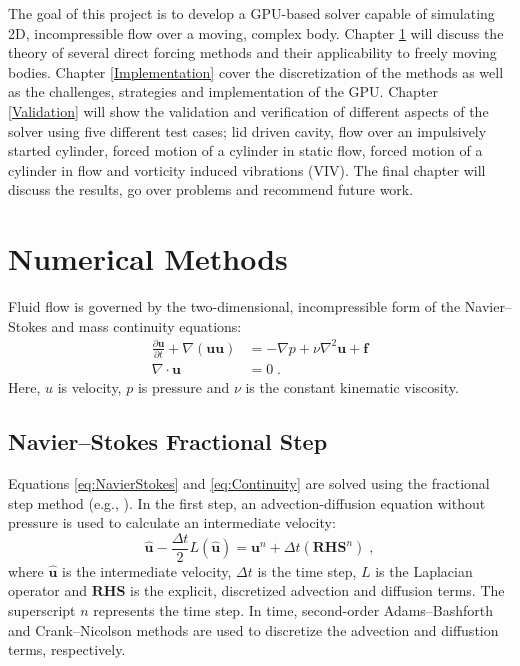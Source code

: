 \documentclass[onehalf,11pt]{beavtex}
\begin{document}
The goal of this project is to develop a GPU-based solver capable of simulating 2D, incompressible flow over a moving, complex body. 
Chapter \ref{Numerical Methods} will discuss the theory of several direct forcing methods and their applicability to freely moving bodies. 
Chapter \ref{Implementation} cover the discretization of the methods as well as the challenges, strategies and implementation of the GPU.
Chapter \ref{Validation} will show the validation and verification of different aspects of the solver using five different test cases; lid driven cavity, flow over an impulsively started cylinder, forced motion of a cylinder in static flow, forced motion of a cylinder in flow and vorticity induced vibrations (VIV).
The final chapter will discuss the results, go over problems and recommend future work.

\chapter{Numerical Methods}\label{Numerical Methods}
Fluid flow is governed by the two-dimensional, incompressible form of the Navier--Stokes and mass continuity equations:
\begin{align}
\frac{\partial \textbf{u}}{\partial t} + \nabla ( \textbf{uu} ) &= -\nabla p + \nu\nabla^{2}\textbf{u} + \textbf{f} \label{eq:NavierStokes} \\
\nabla \cdot \textbf{u} &= 0 \label{eq:Continuity} \;.
\end{align}
Here, $u$ is velocity, $p$ is pressure and $\nu$ is the constant kinematic viscosity.

\section{Navier--Stokes Fractional Step}\label{NM:NavierStokes}
Equations \eqref{eq:NavierStokes} and \eqref{eq:Continuity} are solved using the fractional step method (e.g., \cite{Perot1993}). 
In the first step, an advection-diffusion equation without pressure is used to calculate an intermediate velocity:
\begin{equation}\label{eq:Intermediate Velocity}
\hat{\textbf{u}} - \frac{\Delta t}{2}L(\hat{\textbf{u}}) = \textbf{u}^n + \Delta t(\textbf{RHS}^n) \;,
\end{equation}
where $\hat{\textbf{u}}$ is the intermediate velocity, $\Delta t$ is the time step, $L$ is the Laplacian operator and $\textbf{RHS}$ is the explicit, discretized advection and diffusion terms.
The superscript $n$ represents the time step.
In time, second-order Adams--Bashforth and Crank--Nicolson methods are used to discretize the advection and diffustion terms, respectively.
\end{document}
